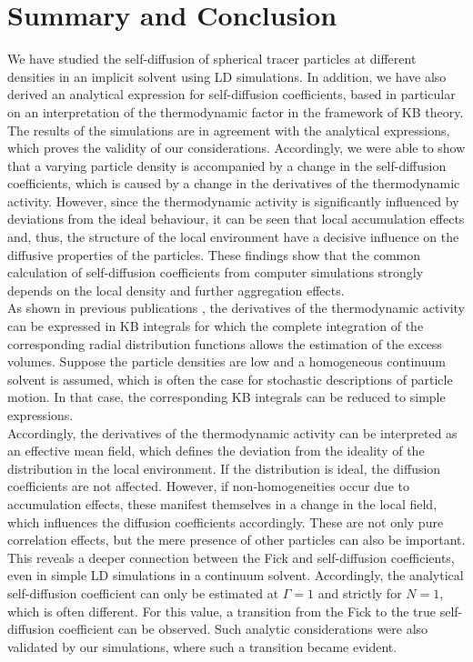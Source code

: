 \documentclass[aip,jcp,reprint]{revtex4-1}
\begin{document}
\section{Summary and Conclusion}
We have studied the self-diffusion of spherical tracer particles at different densities in an implicit solvent using LD simulations. In addition, we have also derived an analytical expression for self-diffusion coefficients, based in particular on an interpretation of the thermodynamic factor in the framework of KB theory. The results of the simulations are in agreement with the analytical expressions, which proves the validity of our considerations. Accordingly, we were able to show that a varying particle density is accompanied by a change in the self-diffusion coefficients, which is caused by a change in the derivatives of the thermodynamic activity. However, since the thermodynamic activity is significantly influenced by deviations from the ideal behaviour, it can be seen that local accumulation effects and, thus, the structure of the local environment have a decisive influence on the diffusive properties of the particles. These findings show that the common calculation of self-diffusion coefficients from computer simulations strongly depends on the local density and further aggregation effects.\\
As shown in previous publications \cite{ben13a,smith06,smiatek17a}, the derivatives of the thermodynamic activity can be expressed in KB integrals for which the complete integration of the corresponding radial distribution functions allows the estimation of the excess volumes. Suppose the particle densities are low and a homogeneous continuum solvent is assumed, which is often the case for stochastic descriptions of particle motion. In that case, the corresponding KB integrals can be reduced to simple expressions. \\
Accordingly, the derivatives of the thermodynamic activity can be interpreted as an effective mean field, which defines the deviation from the ideality of the distribution in the local environment. If the distribution is ideal, the diffusion coefficients are not affected. However, if non-homogeneities occur due to accumulation effects, these manifest themselves in a change in the local field, which influences the diffusion coefficients accordingly. These are not only pure correlation effects, but the mere presence of other particles can also be important. This reveals a deeper connection between the Fick and self-diffusion coefficients, even in simple LD simulations in a continuum solvent. Accordingly, the analytical self-diffusion coefficient can only be estimated at $\Gamma=1$ and strictly for $N=1$, which is often different. For this value, a transition from the Fick to the true self-diffusion coefficient can be observed. Such analytic considerations were also validated by our simulations, where such a transition became evident.  \\
\end{document}
